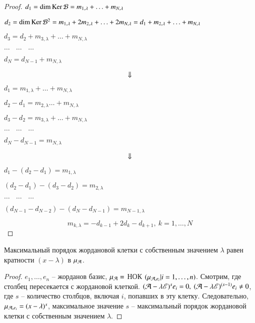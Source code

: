 \documentclass[main]{subfiles}
\begin{document}
\begin{proof}
$d_1 = \dim\operatorname{Ker}{\mathcal{B}} = m_{1,\lambda} + \ldots + m_{N,\lambda}$

$d_2 = \dim\operatorname{Ker}{\mathcal{B}}^2 = m_{1,\lambda} + 2m_{2,\lambda} + \ldots + 2m_{N,\lambda} = d_1 + m_{2,\lambda}+ \ldots + m_{N,\lambda}$

$d_3 = d_2 + m_{3,\lambda} + \ldots + m_{N,\lambda}$

$\dots \ \ \ \ \dots \ \ \ \ \dots$

$d_N = d_{N-1} + m_{N,\lambda}$

\[
  \rotatebox[origin=c]{270}{$\Rightarrow$}
\]


$d_1 = m_{1,\lambda} + \ldots + m_{N,\lambda}$

$d_2 - d_1 = m_{2,\lambda} \ldots + m_{N,\lambda} $

$d_3 - d_2 = m_{3,\lambda} + \ldots + m_{N,\lambda}$

$\dots \ \ \ \ \dots \ \ \ \ \dots$

$d_N - d_{N-1} = m_{N,\lambda}$

\[
  \rotatebox[origin=c]{270}{$\Rightarrow$}
\]

$d_1 - (d_2 -d_1) = m_{1,\lambda}$

$(d_2 - d_1) -(d_3- d_2) = m_{2,\lambda}$

$\dots \ \ \ \ \dots \ \ \ \ \dots$

$(d_{N-1} - d_{N-2}) -(d_N -d_{N-1}) = m_{N-1,\lambda}$

\[
  m_{k,\lambda} = -d_{k-1}+2d_k-d_{k+1},\ k = 1,\ldots, N
\]

\end{proof}

\begin{remark}
  Максимальный порядок жордановой клетки с собственным значением $\lambda$
  равен кратности $(x - \lambda)$ в $\mu_{\mathcal{A}}$.
\end{remark}

\begin{proof}
  $e_1, \ldots, e_n$ -- жорданов базис, $\mu_{\mathcal{A}}=$ НОК $(\mu_{\mathcal{A}, e_i} | i = 1, \ldots, n)$. Смотрим, где столбец пересекается с жордановой клеткой.
  $(\mathcal{A} - \lambda \mathscr{E})^s e_i = 0, \ (\mathcal{A} - \lambda \mathscr{E})^{(s-1)} e_i \neq 0$, где $s$ -- количество столбцов, включая $i$, попавших в эту клетку.
  Следовательно, $\mu_{\mathcal{A}, e_i} = (x - \lambda)^s$, максимальное значение $s$ -- максимальный порядок жордановой клетки с собственным значением $\lambda$.
\end{proof}
\end{document}

